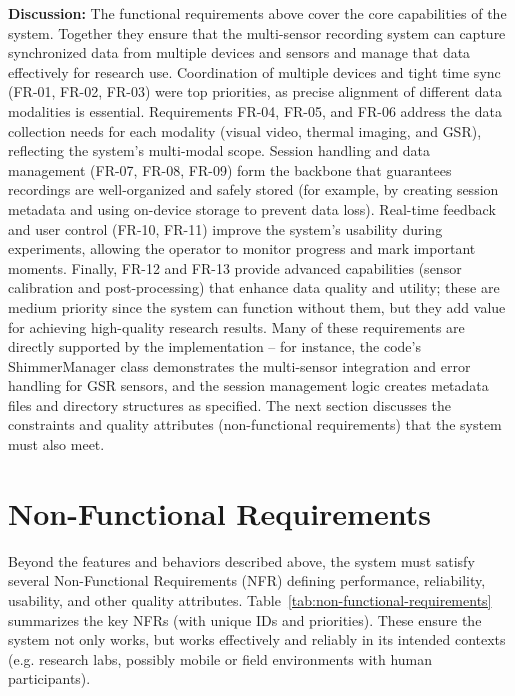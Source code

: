 \textbf{Discussion:} The functional requirements above cover the core capabilities of the system. Together they ensure that the multi-sensor recording system can capture synchronized data from multiple devices and sensors and manage that data effectively for research use. Coordination of multiple devices and tight time sync (FR-01, FR-02, FR-03) were top priorities, as precise alignment of different data modalities is essential. Requirements FR-04, FR-05, and FR-06 address the data collection needs for each modality (visual video, thermal imaging, and GSR), reflecting the system's multi-modal scope. Session handling and data management (FR-07, FR-08, FR-09) form the backbone that guarantees recordings are well-organized and safely stored (for example, by creating session metadata and using on-device storage to prevent data loss). Real-time feedback and user control (FR-10, FR-11) improve the system's usability during experiments, allowing the operator to monitor progress and mark important moments. Finally, FR-12 and FR-13 provide advanced capabilities (sensor calibration and post-processing) that enhance data quality and utility; these are medium priority since the system can function without them, but they add value for achieving high-quality research results. Many of these requirements are directly supported by the implementation -- for instance, the code's ShimmerManager class demonstrates the multi-sensor integration and error handling for GSR sensors, and the session management logic creates metadata files and directory structures as specified. The next section discusses the constraints and quality attributes (non-functional requirements) that the system must also meet.

\section{Non-Functional Requirements}

Beyond the features and behaviors described above, the system must satisfy several Non-Functional Requirements (NFR) defining performance, reliability, usability, and other quality attributes. Table~\ref{tab:non-functional-requirements} summarizes the key NFRs (with unique IDs and priorities). These ensure the system not only works, but works effectively and reliably in its intended contexts (e.g. research labs, possibly mobile or field environments with human participants).

